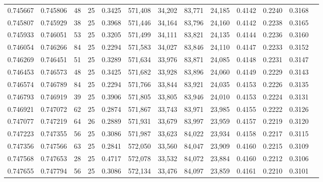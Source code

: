\begin{tabular}{rrrrrrrrrrrrr}
0.745667 & 0.745806 &    48 &  25 &                                     0.3425 & 571,408 &  34,202 &  83,771 &  24,185 & 0.4142 & 0.2240 & 0.3168 \\
0.745807 & 0.745929 &    38 &  25 &                                     0.3968 & 571,446 &  34,164 &  83,796 &  24,160 & 0.4142 & 0.2238 & 0.3165 \\
0.745933 & 0.746051 &    53 &  25 &                                     0.3205 & 571,499 &  34,111 &  83,821 &  24,135 & 0.4144 & 0.2236 & 0.3160 \\
0.746054 & 0.746266 &    84 &  25 &                                     0.2294 & 571,583 &  34,027 &  83,846 &  24,110 & 0.4147 & 0.2233 & 0.3152 \\
0.746269 & 0.746451 &    51 &  25 &                                     0.3289 & 571,634 &  33,976 &  83,871 &  24,085 & 0.4148 & 0.2231 & 0.3147 \\
0.746453 & 0.746573 &    48 &  25 &                                     0.3425 & 571,682 &  33,928 &  83,896 &  24,060 & 0.4149 & 0.2229 & 0.3143 \\
0.746574 & 0.746789 &    84 &  25 &                                     0.2294 & 571,766 &  33,844 &  83,921 &  24,035 & 0.4153 & 0.2226 & 0.3135 \\
0.746793 & 0.746919 &    39 &  25 &                                     0.3906 & 571,805 &  33,805 &  83,946 &  24,010 & 0.4153 & 0.2224 & 0.3131 \\
0.746921 & 0.747072 &    62 &  25 &                                     0.2874 & 571,867 &  33,743 &  83,971 &  23,985 & 0.4155 & 0.2222 & 0.3126 \\
0.747077 & 0.747219 &    64 &  26 &                                     0.2889 & 571,931 &  33,679 &  83,997 &  23,959 & 0.4157 & 0.2219 & 0.3120 \\
0.747223 & 0.747355 &    56 &  25 &                                     0.3086 & 571,987 &  33,623 &  84,022 &  23,934 & 0.4158 & 0.2217 & 0.3115 \\
0.747356 & 0.747566 &    63 &  25 &                                     0.2841 & 572,050 &  33,560 &  84,047 &  23,909 & 0.4160 & 0.2215 & 0.3109 \\
0.747568 & 0.747653 &    28 &  25 &                                     0.4717 & 572,078 &  33,532 &  84,072 &  23,884 & 0.4160 & 0.2212 & 0.3106 \\
0.747655 & 0.747794 &    56 &  25 &                                     0.3086 & 572,134 &  33,476 &  84,097 &  23,859 & 0.4161 & 0.2210 & 0.3101 \\

\end{tabular}
